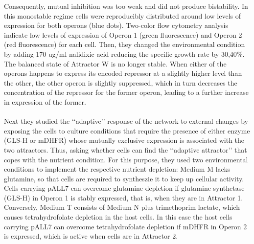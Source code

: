 Consequently, mutual inhibition was too weak and did not produce bistability. In this monostable regime cells were reproducibly distributed around low levels of expression for both operons (blue dots). Two-color flow cytometry analysis indicate low levels of expression of Operon 1 (green fluorescence) and Operon 2 (red fluorescence) for each cell. 
\noindent
Then, they changed the environmental condition by adding 170 ug/ml nalidixic acid reducing the specific growth rate by 30,40\%. The balanced state of Attractor W is no longer stable. When either of the operons happens to express its encoded repressor at a slightly higher level than the other, the other operon is slightly suppressed, which in turn decreases the concentration of the repressor for the former operon, leading to a further increase in expression of the former. 
\\
\\
\noindent
Next they studied the ‘‘adaptive’’ response of the network to external changes by exposing the cells to culture conditions that require the presence of either enzyme (GLS-H or mDHFR) whose mutually exclusive expression is associated with the two attractors. Thus, asking whether cells can find the ‘‘adaptive attractor’’ that copes with the nutrient condition. 
For this purpose, they used two environmental conditions to implement the respective nutrient depletion: Medium M lacks glutamine, so that cells are required to syntheszie it to keep up cellular activity. Cells carrying pALL7 can overcome glutamine depletion if glutamine synthetase (GLS-H) in Operon 1 is stably expressed, that is, when they are in Attractor 1. Conversely, Medium T consists of Medium N plus trimethoprim lactate, which causes tetrahydrofolate depletion in the host cells. 
In this case the host cells carrying pALL7 can overcome tetrahydrofolate depletion if mDHFR in Operon 2 is expressed, which is active when cells are in Attractor 2. 

